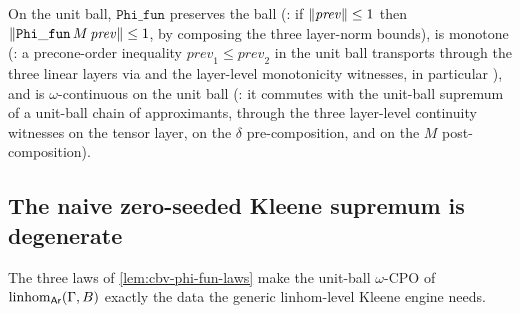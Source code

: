 \begin{lemma}\label{lem:cbv-phi-fun-laws}
\rocqok
{}\rocqok
{}\rocqok
{}
On the unit ball,
$\mathtt{Phi\_fun}$ preserves the ball
(: if
$\lVert \mathit{prev} \rVert \leq 1$ then
$\lVert \mathtt{Phi\_fun}\,M\,\mathit{prev} \rVert \leq 1$, by composing the
three layer-norm bounds), is monotone
(: a precone-order
inequality $\mathit{prev}_1 \leq \mathit{prev}_2$ in the unit ball
transports through the three linear layers via
 and the layer-level
monotonicity witnesses, in particular
), and is
$\omega$-continuous on the unit ball
(: it commutes with the
unit-ball supremum
 of a unit-ball
chain of approximants, through the three layer-level continuity
witnesses
 on the
tensor layer,
 on the
$\delta$ pre-composition, and
 on the $M$
post-composition).
\end{lemma}

\subsection{The naive zero-seeded Kleene supremum is degenerate}%
\label{ssec:cbv-yfix-sup}

The three laws of \autoref{lem:cbv-phi-fun-laws} make the unit-ball
$\omega$-CPO of $\mathrm{linhom}_{\mathsf{Ar}}(\Gamma, B)$ exactly the data the
generic linhom-level Kleene engine
 needs.

